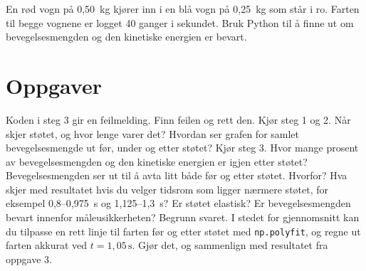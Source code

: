 \documentclass[11pt]{article}
\begin{document}

En rød vogn på 0,50~kg kjører inn i en blå vogn på 0,25~kg som står i ro. Farten til begge vognene er logget 40 ganger i sekundet. Bruk Python til å finne ut om bevegelsesmengden og den kinetiske energien er bevart.

\section*{Oppgaver}

\begin{oppgaveliste}
\oppgave {}Koden i steg 3 gir en feilmelding. Finn feilen og rett den.
\svar
\oppgave {}Kjør steg 1 og 2. Når skjer støtet, og hvor lenge varer det? Hvordan ser grafen for samlet bevegelsesmengde ut før, under og etter støtet?
\svar
\oppgave {}Kjør steg 3. Hvor mange prosent av bevegelsesmengden og den kinetiske energien er igjen etter støtet?
\svar
\oppgave {}Bevegelsesmengden ser ut til å avta litt både før og etter støtet. Hvorfor? Hva skjer med resultatet hvis du velger tidsrom som ligger nærmere støtet, for eksempel 0,8–0,975~s og 1,125–1,3~s?
\svar
\oppgave {}Er støtet elastisk? Er bevegelsesmengden bevart innenfor måleusikkerheten? Begrunn svaret.
\svar
\oppgave {}I stedet for gjennomsnitt kan du tilpasse en rett linje til farten før og etter støtet med \texttt{np.polyfit}, og regne ut farten akkurat ved $t = 1{,}05\,\mathrm{s}$. Gjør det, og sammenlign med resultatet fra oppgave 3.
\svar
\end{oppgaveliste}
\end{document}
